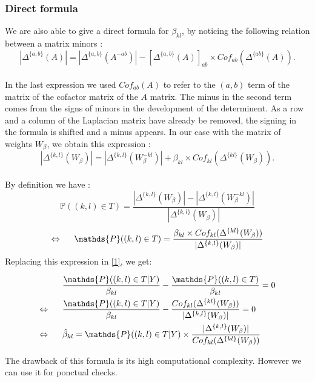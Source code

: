 \documentclass[a4paper,10pt]{article}
\begin{document}
 \subsubsection{Direct formula}
 We are also able to give a direct formula for $\beta_{kl}$, by noticing the following relation between a matrix minors :
 \[|\Delta^{\{a,b\}}(A)|=|\Delta^{\{a,b\}}(A^{- ab})| - [\Delta^{\{a,b\}}(A)]_{ab}\times Cof_{ab}(\Delta^{\{ab\}}(A)).\]\\
 In the last expression we used $Cof_{ab}(A)$ to refer to the $(a,b)$ term of the matrix of the cofactor matrix of the $A$ matrix. The minus in 
 the second term comes from the signs of minors in the development of the determinent. As a row and a column of the Laplacian matrix have
 already be removed, the signing in the formula is shifted and a minus appears. In our case with the matrix of weights $W_\beta$, we obtain this expression :
\[|\Delta^{\{k,l\}}(W_\beta)|=|\Delta^{\{k,l\}}(W_\beta^{- kl})| + \beta_{kl}\times Cof_{kl}(\Delta^{\{kl\}}(W_\beta)).\]\\

By definition we have :
\[\mathds{P}((k,l)\in T ) = \frac{|\Delta^{\{k,l\}}(W_\beta)|-|\Delta^{\{k,l\}}(W_\beta^{- kl})|}{|\Delta^{\{k,l\}}(W_\beta)|}\]
\[\Leftrightarrow  \text{\hspace{0.5cm}}\mathds{P}((k,l)\in T ) =\frac{\beta_{kl}\times Cof_{kl}(\Delta^{\{kl\}}(W_\beta))}{|\Delta^{\{k,l\}}(W_\beta)|}\]
Replacing this expression in \ref{1}, we get:

\begin{align*}
 &\frac{ \mathds{P}((k,l)\in T | Y)}{\beta_{kl}} -\frac{\mathds{P}((k,l)\in T)}{\beta_{kl}} =0 \\
 \Leftrightarrow \text{\hspace{0.5cm}}& \frac{ \mathds{P}((k,l)\in T | Y)}{\beta_{kl}} -\frac{Cof_{kl}(\Delta^{\{kl\}}(W_\beta))}{|\Delta^{\{k,l\}}(W_\beta)|}=0\\
 \Leftrightarrow \text{\hspace{0.5cm}}& \hat{\beta}_{kl} = \mathds{P}((k,l)\in T | Y) \times \frac{|\Delta^{\{k,l\}}(W_\beta)|}{Cof_{kl}(\Delta^{\{kl\}}(W_\beta))}
\end{align*}

The drawback of this formula is its high computational complexity. However we can use it for ponctual checks.
\end{document}
